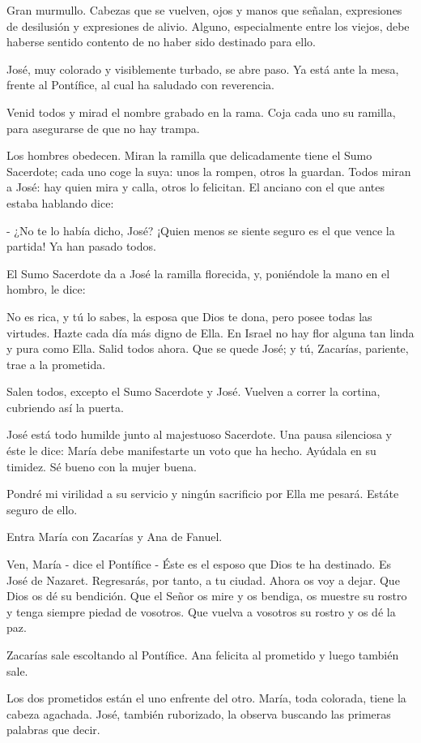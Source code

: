 \documentclass[12pt, twoside, openright]{book} %
\begin{document}
Gran murmullo. Cabezas que se vuelven, ojos y manos que señalan, expresiones de desilusión y expresiones de alivio. Alguno, especialmente entre los viejos, debe haberse sentido contento de no haber sido destinado para ello. 

José, muy colorado y visiblemente turbado, se abre paso. Ya está ante la mesa, frente al Pontífice, al cual ha saludado con reverencia. 

Venid todos y mirad el nombre grabado en la rama. Coja cada uno su ramilla, para asegurarse de que no hay trampa. 

Los hombres obedecen. Miran la ramilla que delicadamente tiene el Sumo Sacerdote; cada uno coge la suya: unos la rompen, otros la guardan. Todos miran a José: hay quien mira y calla, otros lo felicitan. El anciano con el que antes estaba hablando dice: 

- ¿No te lo había dicho, José? ¡Quien menos se siente seguro es el que vence la partida! Ya han pasado todos. 

El Sumo Sacerdote da a José la ramilla florecida, y, poniéndole la mano en el hombro, le dice: 

No es rica, y tú lo sabes, la esposa que Dios te dona, pero posee todas las virtudes. Hazte cada día más digno de Ella. En Israel no hay flor alguna tan linda y pura como Ella. Salid todos ahora. Que se quede José; y tú, Zacarías, pariente, trae a la prometida. 

Salen todos, excepto el Sumo Sacerdote y José. Vuelven a correr la cortina, cubriendo así la puerta. 

José está todo humilde junto al majestuoso Sacerdote. Una pausa silenciosa y éste le dice: María debe manifestarte un voto que ha hecho. Ayúdala en su timidez. Sé bueno con la mujer buena. 

Pondré mi virilidad a su servicio y ningún sacrificio por Ella me pesará. Estáte seguro de ello. 

 Entra María con Zacarías y Ana de Fanuel. 

Ven, María - dice el Pontífice - Éste es el esposo que Dios te ha destinado. Es José de Nazaret. Regresarás, por tanto, a tu ciudad. Ahora os voy a dejar. Que Dios os dé su bendición. Que el Señor os mire y os bendiga, os muestre su rostro y tenga siempre piedad de vosotros. Que vuelva a vosotros su rostro y os dé la paz. 

Zacarías sale escoltando al Pontífice. Ana felicita al prometido y luego también sale. 

Los dos prometidos están el uno enfrente del otro. María, toda colorada, tiene la cabeza agachada. José, también ruborizado, la observa buscando las primeras palabras que decir. 
\end{document}
